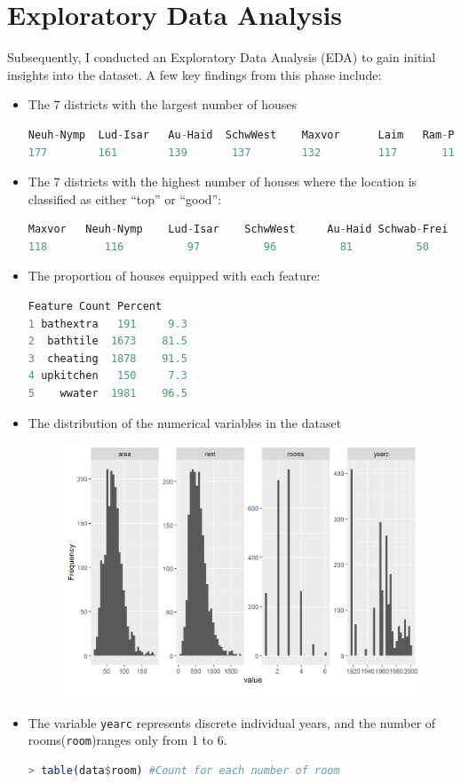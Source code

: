\documentclass[15pt,a4paper]{report}
\begin{document}
\section*{Exploratory Data Analysis}
Subsequently, I conducted an Exploratory Data Analysis (EDA) to gain initial insights into the dataset. A few key findings from this phase include:
\begin{itemize}
	\item The 7 districts with the largest number of houses
	\begin{lstlisting}[language=R]
Neuh-Nymp  Lud-Isar   Au-Haid  SchwWest    Maxvor      Laim   Ram-Per 
177        161        139       137        132         117       115 
	\end{lstlisting}
	\item The 7 districts with the highest number of houses where the location is classified as either “top” or “good”:
		\begin{lstlisting}[language=R]
Maxvor   Neuh-Nymp    Lud-Isar    SchwWest     Au-Haid Schwab-Frei    Trud-Rie 
118         116          97          96          81          50          37 
	\end{lstlisting}
	\item The proportion of houses equipped with each feature:
	\begin{lstlisting}[language=R]
    Feature Count Percent
1 bathextra   191     9.3
2  bathtile  1673    81.5
3  cheating  1878    91.5
4 upkitchen   150     7.3
5    wwater  1981    96.5
	\end{lstlisting}
	\item The distribution of the numerical variables in the dataset
	\begin{figure}[H]
		\centering \includegraphics[width=\textwidth]{unnamed-chunk-10-1.png}
	\end{figure}
	\item The variable \lstinline[language=R]|yearc| represents discrete individual years, and the number of rooms(\lstinline[language=R]|room|)ranges only from 1 to 6.
		\begin{lstlisting}[language=R]
> table(data$room) #Count for each number of room


\end{lstlisting}
\end{itemize}
\end{document}
